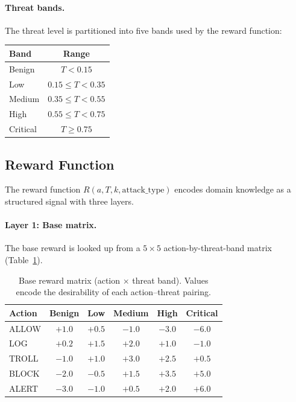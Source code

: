 \paragraph{Threat bands.}
The threat level is partitioned into five bands used by the reward function:

\begin{center}
\begin{tabular}{lc}
  \toprule
  Band & Range \\
  \midrule
  Benign & $T < 0.15$ \\
  Low    & $0.15 \leq T < 0.35$ \\
  Medium & $0.35 \leq T < 0.55$ \\
  High   & $0.55 \leq T < 0.75$ \\
  Critical & $T \geq 0.75$ \\
  \bottomrule
\end{tabular}
\end{center}

\subsection{Reward Function}
\label{sec:reward}

The reward function $R(a, T, k, \text{attack\_type})$ encodes domain
knowledge as a structured signal with three layers.

\paragraph{Layer 1: Base matrix.}
The base reward is looked up from a $5 \times 5$ action-by-threat-band matrix
(Table~\ref{tab:reward_matrix_meth}).

\begin{table}[ht]
  \centering
  \caption{Base reward matrix (action $\times$ threat band).
           Values encode the desirability of each action--threat pairing.}
  \label{tab:reward_matrix_meth}
  \begin{tabular}{lccccc}
    \toprule
    Action & Benign & Low & Medium & High & Critical \\
    \midrule
    ALLOW & $+1.0$ & $+0.5$ & $-1.0$ & $-3.0$ & $-6.0$ \\
    LOG   & $+0.2$ & $+1.5$ & $+2.0$ & $+1.0$ & $-1.0$ \\
    TROLL & $-1.0$ & $+1.0$ & $+3.0$ & $+2.5$ & $+0.5$ \\
    BLOCK & $-2.0$ & $-0.5$ & $+1.5$ & $+3.5$ & $+5.0$ \\
    ALERT & $-3.0$ & $-1.0$ & $+0.5$ & $+2.0$ & $+6.0$ \\
    \bottomrule
  \end{tabular}
\end{table}

